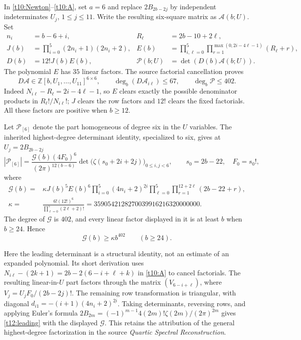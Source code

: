 In \eqref{t10:Newton}--\eqref{t10:A}, set $a=6$ and replace
$2B_{2b-2j}$ by independent indeterminates $U_j$, $1\le j\le11$.
Write the resulting six-square matrix as $\mathcal A(b;U)$. Set
\begin{align*}
 n_i&=b-6+i,&R_\ell&=2b-10+2\ell,\\
 J(b)&=\prod_{i=0}^5(2n_i+1)(2n_i+2),&
 E(b)&=\prod_{i,\ell=0}^5
       \prod_{r=1}^{\max(0,2i-4\ell-1)}(R_\ell+r),\\
 D(b)&=12!J(b)E(b),&
 \mathscr P(b;U)&=\det(D(b)\mathcal A(b;U)).
\end{align*}
The polynomial $E$ has $35$ linear factors. The source factorial
cancellation proves
\[
 D\mathcal A\in\mathbb Z[b,U_1,\ldots,U_{11}]^{6\times6},
 \qquad\deg_b(D\mathcal A_{i\ell})\le67,
 \qquad\deg_b\mathscr P\le402.
\]
Indeed $N_{i\ell}-R_\ell=2i-4\ell-1$, so $E$ clears exactly the
possible denominator products in $R_\ell!/N_{i\ell}!$;
$J$ clears the row factors and $12!$ clears the fixed factorials.
All these factors are positive when $b\ge12$.

Let $\mathscr P_{[6]}$ denote the part homogeneous of degree six in
the $U$ variables. The inherited highest-degree determinant identity,
specialized to six, gives at $U_j=2B_{2b-2j}$
\begin{equation}\label{t12:leading}
 \left|\mathscr P_{[6]}\right|
 =\frac{\mathcal G(b)(4F_0)^6}{(2\pi)^{12(b-6)}}
   \det\bigl(\zeta(s_0+2i+2j)\bigr)_{0\le i,j<6},
 \qquad s_0=2b-22,\quad F_0=s_0!,
\end{equation}
where
\begin{align*}
 \mathcal G(b)={}&\kappa J(b)^5E(b)^6
 \prod_{i=0}^5(4n_i+2)^{\underline{2i}}
 \prod_{\ell=0}^5\prod_{r=1}^{12+2\ell}(2b-22+r),\\
 \kappa={}&\frac{6!(12!)^6}{\prod_{\ell=0}^5(2\ell+2)!}
 =3590542128270039916216320000000.
\end{align*}
The degree of $\mathcal G$ is $402$, and every linear factor displayed
in it is at least $b$ when $b\ge24$. Hence
\begin{equation}\label{t12:Gbound}
 \mathcal G(b)\ge\kappa b^{402}\qquad(b\ge24).
\end{equation}

Here the leading determinant is a structural identity, not an estimate
of an expanded polynomial. Its short derivation uses
$N_{i\ell}-(2k+1)=2b-2(6-i+\ell+k)$ in \eqref{t10:A} to cancel
factorials. The resulting linear-in-$U$ part factors through the
matrix $(V_{6-i+\ell})$, where
$V_j=U_jF_0/(2b-2j)!$. The remaining row transformation is triangular,
with diagonal
$d_{i1}=-(i+1)(4n_i+2)^{\underline{2i}}$.
Taking determinants, reversing rows, and applying Euler's formula
$2B_{2m}=(-1)^{m-1}4(2m)!\zeta(2m)/(2\pi)^{2m}$ gives
\eqref{t12:leading} with the displayed $\mathcal G$. This retains the
attribution of the general highest-degree factorization in the source
\emph{Quartic Spectral Reconstruction}.

